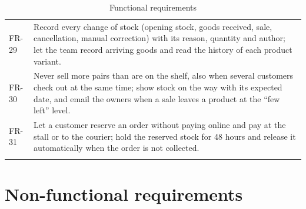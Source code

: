 \begin{longtable}{p{1.4cm} p{12.6cm}}
	FR-29 & Record every change of stock (opening stock, goods received, sale, cancellation, manual correction) with its
	reason, quantity and author; let the team record arriving goods and read the history of each product variant. \\
	FR-30 & Never sell more pairs than are on the shelf, also when several customers check out at the same time; show
	stock on the way with its expected date, and email the owners when a sale leaves a product at the ``few left'' level. \\
	FR-31 & Let a customer reserve an order without paying online and pay at the stall or to the courier; hold the
	reserved stock for 48 hours and release it automatically when the order is not collected. \\
	\bottomrule
	\caption{Functional requirements}
	\label{tab:fr}
\end{longtable}

\section{Non-functional requirements}

